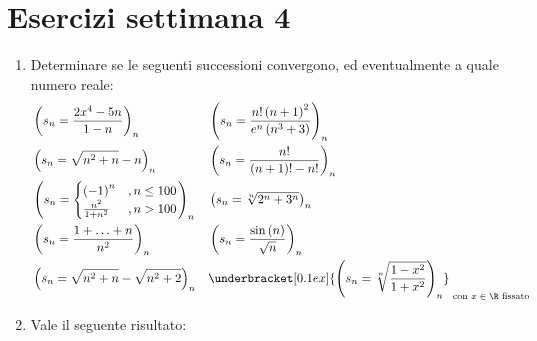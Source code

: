 \section{Esercizi settimana 4}
\begin{enumerate}
	\item Determinare se le seguenti successioni convergono, ed eventualmente a quale numero reale:
	      \begin{align*}
		       & \left(s_n = \frac{2x^{4} - 5n}{1-n}\right)_n            &  & \left(s_n =  \frac{n! \left(n+1\right)^2 }{e^{n}\left(n^3 +3\right)}\right)_n                                        \\
		       & \left(s_n = \sqrt{n^2  + n} -n\right)_n                 &  & \left(s_n = \frac{n!}{\left(n+1\right)! - n!}\right)_n                                                               \\
		       & \left(s_n = \begin{cases}
				                     \left(-1\right)^{n}   & , n \le 100 \\
				                     \frac{n^2 }{1 + n^2 } & , n > 100
			                     \end{cases}\right)_n                 &  & \left(s_n = \sqrt[n]{2^{n} + 3^{n}}\right)_n                                                                                \\
		       & \left(s_n = \frac{1 + \ldots +n}{n^2 }\right)_n         &  & \left(s_n = \frac{\sin \left(n\right)}{\sqrt{n}}\right)_n                                                            \\
		       & \left(s_n = \sqrt{n^2  + n} - \sqrt{ n^2  + 2}\right)_n &  & \underbracket[0.1ex]{\left(s_n = \sqrt[n]{\frac{1 - x^2 }{1 + x^2 }}\right)_n}_{\text{ con $ x \in  \R  $ fissato }}
	      \end{align*}
	\item Vale il seguente risultato:
\end{enumerate}
